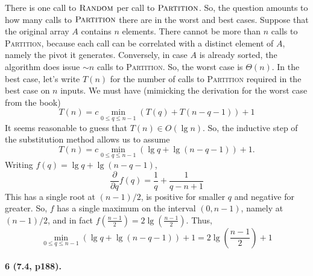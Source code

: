 \documentclass[
]{article}
\begin{document}
There is one call to $\textsc{Random}$ per call to $\textsc{Partition}$.  So, the question amounts to how many calls to $\textsc{Partition}$ there are in the worst and best cases.  
Suppose that the original array $A$ contains $n$ elements.  There cannot be more than $n$ calls to \textsc{Partition}, because each call can be correlated with a distinct element of $A$, namely the pivot it generates.  Conversely, in case $A$ is already sorted, the algorithm does issue $\sim n$ calls to \textsc{Partition}.  So, the worst case is $\Theta(n)$.  
In the best case, let's write $T(n)$ for the number of calls to \textsc{Partition} required in the best case on $n$ inputs.  We must have (mimicking the derivation for the worst case from the book)
\begin{equation}
  \label{eq:5b}
  T(n) = c\min_{0\leq q\leq n-1}(T(q) + T(n - q - 1)) + 1
\end{equation}
It seems reasonable to guess that $T(n) \in O(\lg n)$.  
So, the inductive step of the substitution method allows us to assume
\begin{equation}
  \label{eq:5b}
  T(n) = c\min_{0\leq q\leq n-1}(\lg q + \lg(n-q-1)) + 1.
\end{equation}
Writing $f(q) = \lg q + \lg(n-q-1)$, 
\begin{equation}
  \label{eq:5b}
  \frac{\partial}{\partial q}f(q) = \frac{1}{q} + \frac{1}{q - n + 1}
\end{equation}
This has a single root at $(n-1)/2$, is positive for smaller $q$ and negative for greater.  So, $f$ has a single maximum on the interval $(0, n-1)$, namely at $(n-1)/2$, and in fact $f(\frac{n-1}{2})=2\lg(\frac{n-1}{2})$.  Thus, 
\begin{equation}
  \label{eq:5b}
  \min_{0\leq q\leq n-1}(\lg q + \lg(n-q-1)) + 1 = 2\lg(\frac{n-1}{2}) + 1
\end{equation}

\paragraph{6 (7.4, p188).}
\end{document}
